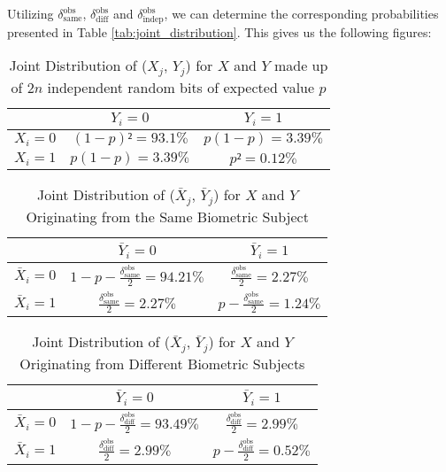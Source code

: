 Utilizing \(\delta_{\text{same}}^{\text{obs}}\), \(\delta_{\text{diff}}^{\text{obs}}\) and \(\delta_{\text{indep}}^{\text{obs}}\), we can determine the corresponding probabilities presented in Table \ref{tab:joint_distribution}. This gives us the following figures:


\begin{table}[H]
    \centering
    \renewcommand{\arraystretch}{1.5}
    \begin{tabular}{|c|c|c|}
        \hline
        & $Y_i = 0$ & $Y_i = 1$\\
        \hline
        $X_i = 0$ & $(1-p)² = 93.1\% $ & $p(1-p) = 3.39\%$\\
        \hline
        $X_i = 1$ & $p(1-p) = 3.39\% $ & $p² = 0.12\%$\\
        \hline
    \end{tabular}
    \caption{Joint Distribution of ($X_j$, $Y_j$) for \(X\) and \(Y\) made up of \(2n\) independent random bits of expected value \(p\)}
    \label{tab:joint_distribution_deltaindep}
\end{table}


\begin{table}[H]
    \centering
    \renewcommand{\arraystretch}{1.5}
    \begin{tabular}{|c|c|c|}
        \hline
        & $\bar{Y}_i = 0$ & $\bar{Y}_i = 1$\\
        \hline
        $\bar{X}_i = 0$ & $1 - p - \frac{\delta_{\text{same}}^{\text{obs}}}{2} = 94.21\% $ & $\frac{\delta_{\text{same}}^{\text{obs}}}{2} = 2.27\%$\\
        \hline
        $\bar{X}_i = 1$ & $\frac{\delta_{\text{same}}^{\text{obs}}}{2} = 2.27\%$ & $p - \frac{\delta_{\text{same}}^{\text{obs}}}{2} = 1.24\%$\\
        \hline
    \end{tabular}
    \caption{Joint Distribution of ($\bar{X}_j$, $\bar{Y}_j$) for \(X\) and \(Y\)  Originating from the Same Biometric Subject}
    \label{tab:joint_distribution_deltasame}
\end{table}

\begin{table}[H]
    \centering
    \renewcommand{\arraystretch}{1.5}
    \begin{tabular}{|c|c|c|}
        \hline
        & $\bar{Y}_i = 0$ & $\bar{Y}_i = 1$\\
        \hline
        $\bar{X}_i = 0$ & $1 - p - \frac{\delta_{\text{diff}}^{\text{obs}}}{2} = 93.49\% $ & $\frac{\delta_{\text{diff}}^{\text{obs}}}{2} = 2.99\%$\\
        \hline
        $\bar{X}_i = 1$ & $\frac{\delta_{\text{diff}}^{\text{obs}}}{2} = 2.99\%$ & $p - \frac{\delta_{\text{diff}}^{\text{obs}}}{2} = 0.52\%$\\
        \hline
    \end{tabular}
    \caption{Joint Distribution of ($\bar{X}_j$, $\bar{Y}_j$) for \(X\) and \(Y\) Originating from Different Biometric Subjects}
    \label{tab:joint_distribution_deltadiff}
\end{table}








